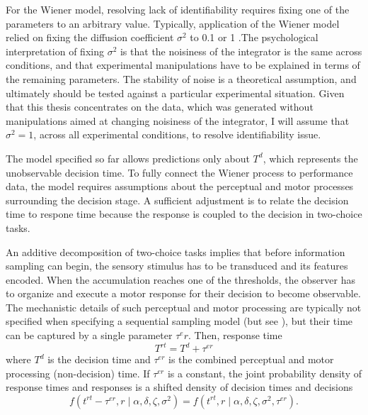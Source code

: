 \documentclass[12pt]{article}
\begin{document}
For the Wiener model, resolving lack of identifiability requires fixing one of the parameters to an arbitrary value. Typically, application of the Wiener model relied on fixing the diffusion coefficient $\sigma^2$ to 0.1 or 1 \citep{Rat1978,RatTue2002,RatMck2008}.The psychological interpretation of fixing $\sigma^2$ is that the noisiness of the integrator is the same across conditions, and that experimental manipulations have to be explained in terms of the remaining parameters. The stability of noise is a theoretical assumption, and ultimately should be tested against a particular experimental situation. Given that this thesis concentrates on the \citet{RatRou1998} data, which was generated without manipulations aimed at changing noisiness of the integrator, I will assume that $\sigma^2 = 1$, across all experimental conditions, to resolve identifiability issue.
 
The model specified so far allows predictions only about $T^d$, which represents the unobservable 
decision time. To fully connect the Wiener process to performance
data, the model requires assumptions about the perceptual and motor
processes surrounding the decision stage. A  sufficient adjustment is to relate the decision time to respone time because the response is coupled to the decision in two-choice tasks.

An additive decomposition of two-choice tasks implies that
before information sampling can begin, the sensory stimulus has to be
transduced and its features encoded. When the accumulation reaches one
of the thresholds, the observer has to organize and execute a motor
response for their decision to become observable. The mechanistic details of such
perceptual and motor processing are typically not specified when specifying a sequential sampling model (but see
\citet{SmiRat2009}), but their time can be captured by a single parameter
$\tau^er$. Then, response time
%
\begin{equation}
T^{rt} = T^d + \tau^{er}
\end{equation}
%
where $T^d$ is the decision time and $\tau^{er}$ is the combined perceptual
and motor processing (non-decision) time. If $\tau^{er}$ is a
constant, the joint probability density of response times and responses is
a shifted density of decision times and decisions
%
\begin{equation}
f(t^{rt} - \tau^{er}, r \mid \alpha, \delta, \zeta, \sigma^2) = f(t^{rt}, r \mid \alpha, \delta, \zeta, \sigma^2, \tau^{er}).
\end{equation}
\end{document}
